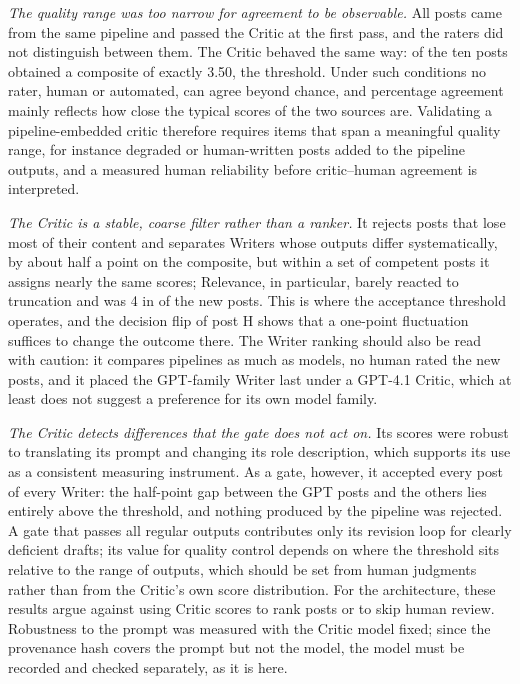 \documentclass[a4paper,twoside]{article}
\begin{document}
\emph{The quality range was too narrow for agreement to be observable.} All posts came from the same pipeline and passed the Critic at the first pass, and the raters did not distinguish between them. The Critic behaved the same way: \CompAtThreshold{} of the ten posts obtained a composite of exactly 3.50, the threshold. Under such conditions no rater, human or automated, can agree beyond chance, and percentage agreement mainly reflects how close the typical scores of the two sources are. Validating a pipeline-embedded critic therefore requires items that span a meaningful quality range, for instance degraded or human-written posts added to the pipeline outputs, and a measured human reliability before critic--human agreement is interpreted.

\emph{The Critic is a stable, coarse filter rather than a ranker.} It rejects posts that lose most of their content and separates Writers whose outputs differ systematically, by about half a point on the composite, but within a set of competent posts it assigns nearly the same scores; Relevance, in particular, barely reacted to truncation and was 4 in \BmRelModeShare{} of the new posts. This is where the acceptance threshold operates, and the decision flip of post H shows that a one-point fluctuation suffices to change the outcome there. The Writer ranking should also be read with caution: it compares pipelines as much as models, no human rated the new posts, and it placed the GPT-family Writer last under a GPT-4.1 Critic, which at least does not suggest a preference for its own model family.

\emph{The Critic detects differences that the gate does not act on.} Its scores were robust to translating its prompt and changing its role description, which supports its use as a consistent measuring instrument. As a gate, however, it accepted every post of every Writer: the half-point gap between the GPT posts and the others lies entirely above the threshold, and nothing produced by the pipeline was rejected. A gate that passes all regular outputs contributes only its revision loop for clearly deficient drafts; its value for quality control depends on where the threshold sits relative to the range of outputs, which should be set from human judgments rather than from the Critic's own score distribution. For the architecture, these results argue against using Critic scores to rank posts or to skip human review. Robustness to the prompt was measured with the Critic model fixed; since the provenance hash covers the prompt but not the model, the model must be recorded and checked separately, as it is here.
\end{document}
